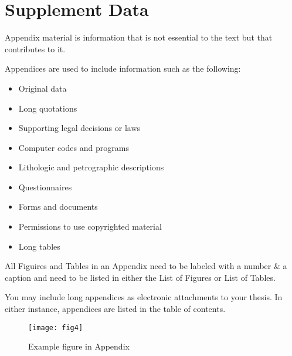 \chapter{Supplement Data}

Appendix material is information that is not
essential to the text but that contributes to it.

Appendices are used to include information such as the following:

\begin{itemize}
	\item Original data
	\item Long quotations 
	\item Supporting legal decisions or laws 
	\item Computer codes and programs 
	\item Lithologic and petrographic descriptions
	\item Questionnaires 	
	\item Forms and documents 
	\item Permissions to use copyrighted material
	\item Long tables
\end{itemize}


All Figuires and  Tables in an Appendix need to be labeled with a number \& a caption and need to be listed in either the List of Figures or List of Tables.

You may include long appendices as electronic attachments to your thesis. In either instance, appendices are listed in the table of contents.

\begin{figure}[h]
	\centering
	\texttt{[image: fig4]}
	\caption{Example figure in Appendix}
\end{figure}